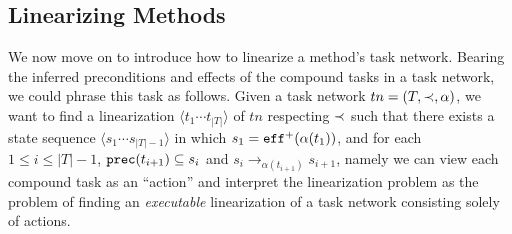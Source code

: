 \subsection{Linearizing Methods}

We now move on to introduce how to linearize a method's task network. Bearing the inferred preconditions and effects of the compound tasks in a task network, we could phrase this task as follows. Given a task network $tn = (T, \mathord{\prec}{}, \alpha)$, we want to find a linearization $\langle t_{1} \cdots t_{|T|} \rangle$ of $tn$ respecting $\mathord{\prec}{}$ such that there exists a state sequence $\langle s_{1} \cdots s_{|T| - 1} \rangle$ in which $s_{1} = \mathtt{eff}^{+}(\alpha(t_{1}))$, and for each $1 \leq i \leq |T| - 1$, $\mathtt{prec}(t_{i + 1}) \subseteq s_{i}$ and $s_{i} \to_{\alpha(t_{i + 1})} s_{i + 1}$, namely we can view each compound task as an ``action'' and interpret the linearization problem as the problem of finding an \emph{executable} linearization of a task network consisting solely of actions.